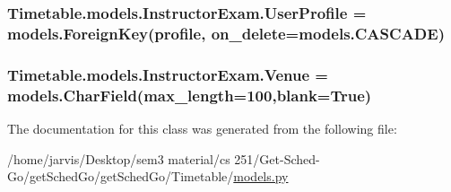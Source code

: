 \subsubsection[{\texorpdfstring{User\+Profile}{UserProfile}}]{\setlength{\rightskip}{0pt plus 5cm}Timetable.\+models.\+Instructor\+Exam.\+User\+Profile = models.\+Foreign\+Key({\bf profile}, on\+\_\+delete=models.\+C\+A\+S\+C\+A\+DE)\hspace{0.3cm}{\ttfamily [static]}}\hypertarget{classTimetable_1_1models_1_1InstructorExam_af326282d965bce96fab4299110f263ed}{}\label{classTimetable_1_1models_1_1InstructorExam_af326282d965bce96fab4299110f263ed}
\subsubsection[{\texorpdfstring{Venue}{Venue}}]{\setlength{\rightskip}{0pt plus 5cm}Timetable.\+models.\+Instructor\+Exam.\+Venue = models.\+Char\+Field(max\+\_\+length=100,blank=True)\hspace{0.3cm}{\ttfamily [static]}}\hypertarget{classTimetable_1_1models_1_1InstructorExam_a9f5ce43673952abe53e402c9caefb1ec}{}\label{classTimetable_1_1models_1_1InstructorExam_a9f5ce43673952abe53e402c9caefb1ec}


The documentation for this class was generated from the following file\+:\begin{DoxyCompactItemize}
\item 
/home/jarvis/\+Desktop/sem3 material/cs 251/\+Get-\/\+Sched-\/\+Go/get\+Sched\+Go/get\+Sched\+Go/\+Timetable/\hyperlink{Timetable_2models_8py}{models.\+py}\end{DoxyCompactItemize}
